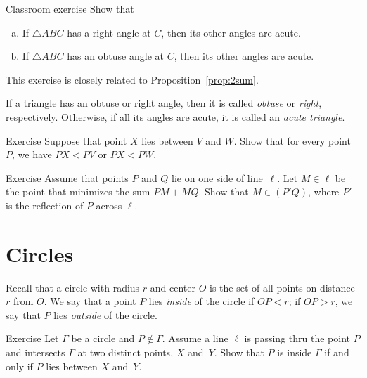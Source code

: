 \begin{thm}{Classroom exercise}\label{ex:right-acute}
Show that
\begin{enumerate}[(a)]
\item If $\triangle ABC$ has a right angle at $C$, then its other angles are acute.
\item If $\triangle ABC$ has an obtuse angle at $C$, then its other angles are acute.
\end{enumerate}
\end{thm}

This exercise is closely related to Proposition~\ref{prop:2sum}.

If a triangle has an obtuse or right angle, then it is called \emph{obtuse} or \emph{right}, respectively.
Otherwise, if all its angles are acute, it is called an \emph{acute triangle}.

\begin{thm}{Exercise}\label{ex:obtuce}
Suppose that point $X$ lies between $V$ and $W$.
Show that for every point $P$, we have $PX < PV$ or $PX < PW$.
\end{thm}

\begin{thm}{Exercise}\label{ex:PMQ}
Assume that points $P$ and $Q$ lie on one side of line~$\ell$.
Let $M\in \ell$ be the point that minimizes the sum $PM+MQ$.
Show that $M\in (P'Q)$, where $P'$ is the reflection of $P$ across $\ell$.
\end{thm}



\section{Circles}

Recall that a circle with radius $r$ and center $O$ is the set of all points on distance $r$ from $O$.
We say that a point $P$ lies \emph{inside} of the circle if $OP<r$; 
if $OP>r$, we say that $P$ lies \emph{outside} of the circle.
\label{def:circle}

\begin{thm}{Exercise}\label{ex:inside-outside}
Let $\Gamma$ be a circle and $P\notin \Gamma$.
Assume a line $\ell$ is passing thru the point $P$
and intersects $\Gamma$ at two distinct points, $X$ and~$Y$.
Show that $P$ is inside $\Gamma$ if and only if $P$ lies between $X$ and~$Y$.
\end{thm}


